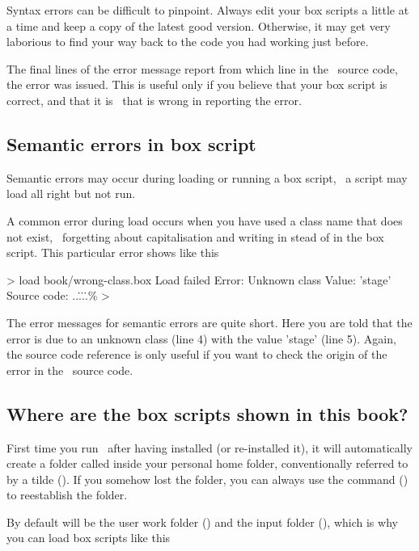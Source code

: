 Syntax errors can be difficult to pinpoint. Always edit your box scripts a little at a time and keep a copy of the latest good version. Otherwise, it may get very laborious to find your way back to the code you had working just before.

The final lines of the error message report from which line in the \US\ source code, the error was issued. This is useful only if you believe that your box script is correct, and that it is \US\ that is wrong in reporting the error.

\subsection{Semantic errors in box script}
Semantic errors may occur during loading or running a box script, \ie\ a script may load all right but not run.

A common error during load occurs when you have used a class name that does not exist, \eg\ forgetting about capitalisation and writing  in stead of  in the box script. This particular error shows like this

\lstset{numbers=left}
\begin{userror}
> load book/wrong-class.box
Load failed
Error: Unknown class
Value: 'stage'
Source code: ..\..\..\..\src\plugins\%\brk%
>
\end{userror}
\lstset{numbers=none}

The error messages for semantic errors are quite short. Here you are told that the error is due to an unknown class (line 4) with the value 'stage' (line 5). Again, the source code reference is only useful if you want to check the origin of the error in the \US\ source code.

\subsection{Where are the box scripts shown in this book?}
First time you run \US\ after having installed (or re-installed it), it will automatically create a folder called  inside your personal home folder, conventionally referred to by a tilde (\filename{\mytilde}). If you somehow lost the  folder, you can always use the  command () to reestablish the folder.

By default  will be the user work folder (\ushome) and  the input folder (), which is why you can load box scripts like this

